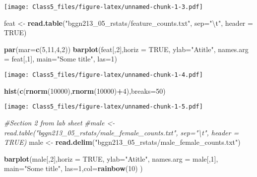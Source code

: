 \documentclass[]{article}
\newenvironment{Shaded}{\begin{snugshade}}{\end{snugshade}}
\newcommand{\KeywordTok}[1]{\textcolor[rgb]{0.13,0.29,0.53}{\textbf{#1}}}
\newcommand{\DataTypeTok}[1]{\textcolor[rgb]{0.13,0.29,0.53}{#1}}
\newcommand{\DecValTok}[1]{\textcolor[rgb]{0.00,0.00,0.81}{#1}}
\newcommand{\CharTok}[1]{\textcolor[rgb]{0.31,0.60,0.02}{#1}}
\newcommand{\StringTok}[1]{\textcolor[rgb]{0.31,0.60,0.02}{#1}}
\newcommand{\CommentTok}[1]{\textcolor[rgb]{0.56,0.35,0.01}{\textit{#1}}}
\newcommand{\OtherTok}[1]{\textcolor[rgb]{0.56,0.35,0.01}{#1}}
\newcommand{\OperatorTok}[1]{\textcolor[rgb]{0.81,0.36,0.00}{\textbf{#1}}}
\newcommand{\NormalTok}[1]{#1}
\begin{document}
\texttt{[image: Class5\_files/figure-latex/unnamed-chunk-1-3.pdf]}

\begin{Shaded}
\begin{Highlighting}[]
\NormalTok{feat <-}\StringTok{ }\KeywordTok{read.table}\NormalTok{(}\StringTok{"bggn213_05_rstats/feature_counts.txt"}\NormalTok{, }\DataTypeTok{sep=}\StringTok{"}\CharTok{\textbackslash{}t}\StringTok{"}\NormalTok{, }\DataTypeTok{header =} \OtherTok{TRUE}\NormalTok{)}

\KeywordTok{par}\NormalTok{(}\DataTypeTok{mar=}\KeywordTok{c}\NormalTok{(}\DecValTok{5}\NormalTok{,}\DecValTok{11}\NormalTok{,}\DecValTok{4}\NormalTok{,}\DecValTok{2}\NormalTok{))}
\KeywordTok{barplot}\NormalTok{(feat[,}\DecValTok{2}\NormalTok{],}\DataTypeTok{horiz =} \OtherTok{TRUE}\NormalTok{, }\DataTypeTok{ylab=}\StringTok{"Atitle"}\NormalTok{, }\DataTypeTok{names.arg =}\NormalTok{ feat[,}\DecValTok{1}\NormalTok{], }\DataTypeTok{main=}\StringTok{"Some title"}\NormalTok{, }\DataTypeTok{las=}\DecValTok{1}\NormalTok{)}
\end{Highlighting}
\end{Shaded}

\texttt{[image: Class5\_files/figure-latex/unnamed-chunk-1-4.pdf]}

\begin{Shaded}
\begin{Highlighting}[]
\KeywordTok{hist}\NormalTok{(}\KeywordTok{c}\NormalTok{(}\KeywordTok{rnorm}\NormalTok{(}\DecValTok{10000}\NormalTok{),}\KeywordTok{rnorm}\NormalTok{(}\DecValTok{10000}\NormalTok{)}\OperatorTok{+}\DecValTok{4}\NormalTok{),}\DataTypeTok{breaks=}\DecValTok{50}\NormalTok{) }
\end{Highlighting}
\end{Shaded}

\texttt{[image: Class5\_files/figure-latex/unnamed-chunk-1-5.pdf]}

\begin{Shaded}
\begin{Highlighting}[]
\CommentTok{#Section 2 from lab sheet}
\CommentTok{#male <- read.table("bggn213_05_rstats/male_female_counts.txt", sep="\textbackslash{}t", header = TRUE)}
\NormalTok{male <-}\StringTok{ }\KeywordTok{read.delim}\NormalTok{(}\StringTok{"bggn213_05_rstats/male_female_counts.txt"}\NormalTok{)}

\KeywordTok{barplot}\NormalTok{(male[,}\DecValTok{2}\NormalTok{],}\DataTypeTok{horiz =} \OtherTok{TRUE}\NormalTok{, }\DataTypeTok{ylab=}\StringTok{"Atitle"}\NormalTok{, }\DataTypeTok{names.arg =}\NormalTok{ male[,}\DecValTok{1}\NormalTok{], }\DataTypeTok{main=}\StringTok{"Some title"}\NormalTok{, }\DataTypeTok{las=}\DecValTok{1}\NormalTok{,}\DataTypeTok{col=}\KeywordTok{rainbow}\NormalTok{(}\DecValTok{10}\NormalTok{) )}
\end{Highlighting}
\end{Shaded}
\end{document}
